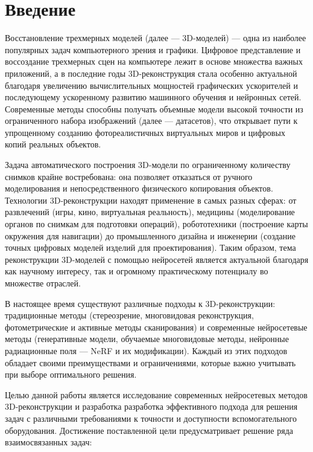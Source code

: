 \chapter{Введение}

Восстановление трехмерных моделей (далее — 3D-моделей) — одна из наиболее
популярных задач компьютерного зрения и графики. Цифровое представление и
воссоздание трехмерных сцен на компьютере лежит в основе множества важных
приложений, а в последние годы 3D-реконструкция стала особенно актуальной
благодаря увеличению вычислительных мощностей графических ускорителей и
последующему ускоренному развитию машинного обучения и нейронных сетей.
Современные методы способны получать объемные модели высокой точности из
ограниченного набора изображений (далее — датасетов), что открывает пути к
упрощенному созданию фотореалистичных виртуальных миров и цифровых копий
реальных объектов.

Задача автоматического построения 3D-модели по ограниченному количеству снимков
крайне востребована: она позволяет отказаться от ручного моделирования и
непосредственного физического копирования объектов. Технологии 3D-реконструкции
находят применение в самых разных сферах: от развлечений (игры, кино,
виртуальная реальность), медицины (моделирование органов по снимкам для
подготовки операций), робототехники (построение карты окружения для навигации)
до промышленного дизайна и инженерии (создание точных цифровых моделей изделий
для проектирования). Таким образом, тема реконструкции 3D-моделей с помощью
нейросетей является актуальной благодаря как научному интересу, так и огромному
практическому потенциалу во множестве отраслей.

В настоящее время существуют различные подходы к 3D-реконструкции: традиционные
методы (стереозрение, многовидовая реконструкция, фотометрические и активные
методы сканирования) и современные нейросетевые методы (генеративные модели,
обучаемые многовидовые методы, нейронные радиационные поля — NeRF и их
модификации). Каждый из этих подходов обладает своими преимуществами и
ограничениями, которые важно учитывать при выборе оптимального решения.

Целью данной работы является исследование современных нейросетевых методов
3D-реконструкции и разработка  разработка эффективного подхода для решения задач
с различными требованиями к точности и доступности вспомогательного
оборудования. Достижение поставленной цели предусматривает решение ряда
взаимосвязанных задач:

